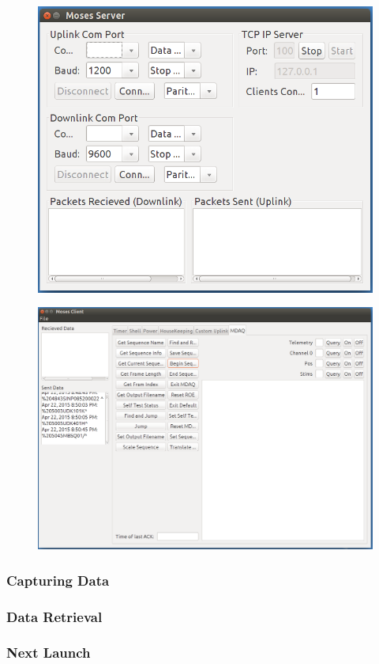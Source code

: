 \documentclass[landscape,xcolor={table}]{beamer}
\begin{document}
\begin{frame}
\begin{minipage}[t]{.44\textwidth}
		  \begin{figure}
		  \includegraphics[width=\textwidth]{server_scr}
		  \end{figure}
		  \begin{figure}
 		  \includegraphics[width=\textwidth]{client_scr}
 		  \end{figure}
		
		\end{minipage}
		
		

	\end{frame}
	
	\begin{frame}
		
		\frametitle{Capturing Data}

	\end{frame}
	
	\begin{frame}
		
		\frametitle{Data Retrieval}

	\end{frame}
	
	\begin{frame}
		
		\frametitle{Next Launch}

	\end{frame}
	
\end{document}
